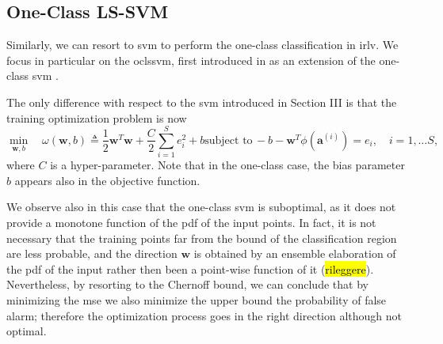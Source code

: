 \documentclass[draftcls,onecolumn,12pt]{IEEEtran}
\begin{document}
{\subsection{One-Class LS-SVM}

Similarly, we can resort to \ac{svm} to perform the one-class classification in \ac{irlv}. We focus in particular on the  \ac{oclssvm}, first introduced in \cite{choi2009} as an extension of the one-class \ac{svm} \cite{Scholkopf2001estimating}. 

The only difference with respect to the \ac{svm} introduced in Section III is that the training optimization problem is now
\begin{subequations}
	\label{eq:oneClassSvm}
	\begin{equation}
	\label{eq:oneClass1}
	\underset{\bm{w},b}{\min} \quad \omega(\bm{w}, b) \triangleq
	 \frac{1}{2} \bm{w}^T \bm{w} +  \frac{C}{2} \sum_{i=1}^S e_i^2 +b
	\end{equation}
	\begin{equation}
	\label{eq:oneClassConstr}
	\text{subject to}\, -b - \bm{w}^T \phi (\bm{a}^{(i)})  = e_i,  \quad i = 1,\dots S, 
	\end{equation}
\end{subequations}
where $C$ is a hyper-parameter.
Note that in the one-class case, the bias parameter $b$ appears also in the objective function.


We observe also in this case that the one-class \ac{svm} is suboptimal, as it does not provide a monotone function of the \ac{pdf} of the input points. In fact, it is not necessary that the training points far from the bound of the classification region are less probable, and the direction $\bm{w}$ is obtained by an ensemble elaboration of the \ac{pdf} of the input rather then been a point-wise function of it (\hl{rileggere}). Nevertheless, by resorting to the Chernoff bound, we can conclude that by minimizing the \ac{mse} we also minimize the upper bound the probability of false alarm; therefore the optimization process goes in the right direction although not optimal.



}
\end{document}
